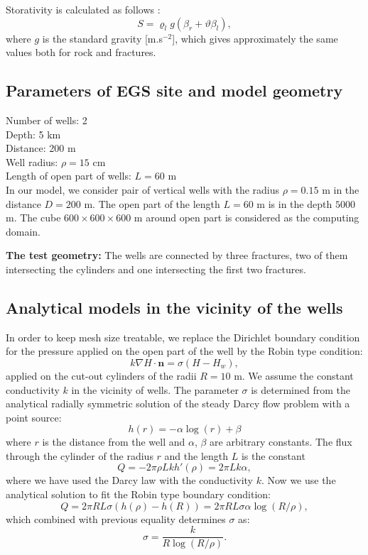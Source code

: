 \documentclass{article}
\newcommand{\eq}[1]{\begin{equation}#1\end{equation}}
\newcommand{\nn}{\vc n}
\newcommand{\vc}[1]{\boldsymbol{#1}}
\begin{document}
Storativity is calculated as follows \cite{brace-et-al}:
\[ S = \varrho_l g(\beta_r + \vartheta\beta_l), \]
where $g$ is the standard gravity [m.s${}^{-2}$], which gives approximately the same values both for rock and fractures.

\subsection{Parameters of EGS site and model geometry}

Number of wells: 2 \\
Depth: 5 km \\
Distance: 200 m \\
Well radius: $\rho = 15$ cm \\
Length of open part of wells: $L=60$ m \\



In our model, we consider pair of vertical wells with the radius $\rho=0.15$ m in the distance $D=200$ m. The open part of the length $L=60$ m is in the depth $5000$ m. The cube $600 \times 600 \times 600$ m around open part is considered as the computing domain. 

{\bf The test geometry:} The wells are connected by three fractures, two of them intersecting the cylinders and one intersecting the first two fractures.

\subsection{Analytical models in the vicinity of the wells}
In order to keep mesh size treatable, we replace the Dirichlet boundary condition for the pressure applied on the open part of the well by the Robin type condition:
%
\eq{\label{eq:H_robin} k\nabla H\cdot\nn = \sigma(H-H_w), }
%
applied on the cut-out cylinders of the radii $R=10$ m. We assume the constant conductivity $k$ in the vicinity of wells. The parameter $\sigma$ is determined from the analytical radially symmetric solution
of the steady Darcy flow problem with a point source:
\[
    h(r) = -\alpha \log (r) + \beta
\]
where $r$ is the distance from the well and $\alpha$, $\beta$ are arbitrary constants.
The flux through the cylinder of the radius $r$ and the length $L$ is the constant
\[  
    Q = -2\pi \rho L k h'(\rho) = 2\pi L k \alpha,
\]
where we have used the Darcy law with the conductivity $k$. Now we use the analytical solution to fit the Robin type boundary condition:
\[
    Q = 2\pi R L \sigma (h(\rho) - h(R)) = 2\pi R L \sigma \alpha \log(R/\rho),
\]
which combined with previous equality determines $\sigma$ as:
\[ 
    \sigma = \frac{k}{R\log(R/\rho)}.
\]
\end{document}
